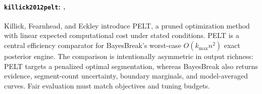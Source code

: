 
\paragraph{\texttt{killick2012pelt}: \citet{killick2012pelt}.}
Killick, Fearnhead, and Eckley introduce PELT, a pruned optimization method with linear expected computational cost under stated conditions. PELT is a central efficiency comparator for BayesBreak's worst-case $O(k_{\max}n^2)$ exact posterior engine. The comparison is intentionally asymmetric in output richness: PELT targets a penalized optimal segmentation, whereas BayesBreak also returns evidence, segment-count uncertainty, boundary marginals, and model-averaged curves. Fair evaluation must match objectives and tuning budgets.

